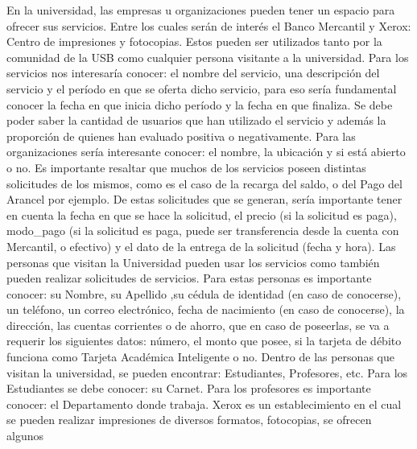 \message{ !name(InformeFase2.tex)}\documentclass[12pt,a4paper,spanish]{article}
\begin{document}
\indent En la universidad, las empresas u organizaciones pueden tener un espacio para
ofrecer sus servicios. Entre los cuales ser\'an de inter\'es el
Banco Mercantil y Xerox: Centro de impresiones y fotocopias. Estos
pueden ser utilizados tanto por la comunidad de la USB como cualquier
persona visitante a la universidad. Para los servicios nos interesar\'ia conocer: el nombre del
servicio, una descripci\'on del servicio y el per\'iodo en que se
oferta dicho servicio, para eso ser\'ia fundamental conocer la fecha
en que inicia dicho per\'iodo y la fecha en que finaliza. Se debe poder saber la cantidad de usuarios
que han utilizado el servicio y adem\'as la proporci\'on de quienes
han evaluado positiva o negativamente. Para las organizaciones ser\'ia
interesante conocer: el nombre,  la ubicaci\'on y si est\'a abierto o no.
\newline
\newline
\newline
\newline
\indent Es importante resaltar que muchos de los servicios poseen
distintas solicitudes de los mismos, como es el caso de la recarga del
saldo, o del Pago del Arancel por ejemplo. De estas solicitudes que se
generan, ser\'ia importante tener en cuenta la fecha en que se hace la
solicitud, el precio (si la solicitud es paga), modo_pago (si la
solicitud es paga, puede ser transferencia desde la cuenta con
Mercantil, o efectivo) y el dato de la entrega de la solicitud (fecha y hora).
\newline
\newline
\indent Las personas que visitan la Universidad pueden usar los
servicios como tambi\'en pueden realizar solicitudes de
servicios. Para estas personas es importante conocer: su Nombre, su
Apellido ,su c\'edula de identidad (en caso de conocerse), un
tel\'efono, un correo electr\'onico, fecha de nacimiento (en caso de
conocerse), la direcci\'on, las cuentas corrientes o de ahorro, que en
caso de poseerlas, se va a requerir los siguientes datos: n\'umero, el
monto que posee, si la tarjeta de d\'ebito funciona como Tarjeta
Acad\'emica Inteligente o no. Dentro de las personas que visitan la
universidad, se pueden encontrar: Estudiantes, Profesores, etc. Para
los Estudiantes se debe conocer: su Carnet. Para los
profesores es importante conocer: el Departamento donde
trabaja. 
\newline
\newline
\indent Xerox es un establecimiento en el cual se pueden realizar
impresiones de diversos formatos, fotocopias, se ofrecen algunos
\end{document}
